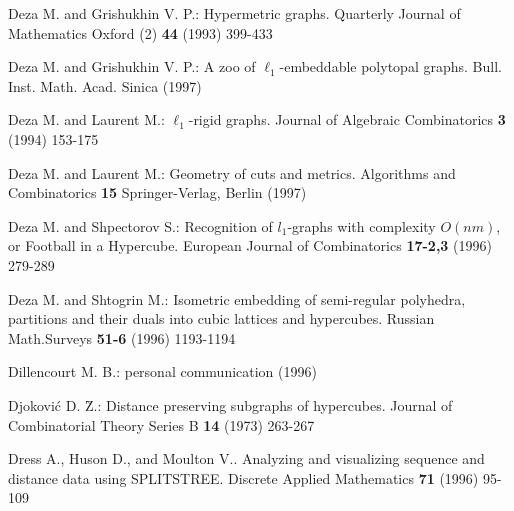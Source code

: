 \begin{thebibliography}{99}
Deza M. and Grishukhin V. P.: 
Hypermetric graphs. 
Quarterly Journal of Mathematics Oxford (2) {\bf 44} (1993) 399-433   
\vspace{-3mm}

Deza M. and Grishukhin V. P.: 
A zoo of $\ell_1$-embeddable polytopal graphs.
Bull. Inst. Math. Acad. Sinica (1997)
\vspace{-3mm}

Deza M. and Laurent M.: 
$\ell_1$-rigid graphs.
Journal of Algebraic Combinatorics {\bf 3} (1994) 153-175
\vspace{-3mm}

Deza M. and Laurent M.:
Geometry of cuts and metrics.
Algorithms and Combinatorics {\bf 15} Springer-Verlag, Berlin
(1997)
\vspace{-3mm}

Deza M. and Shpectorov S.: 
Recognition of $l_{1}$-graphs with complexity $O(nm)$, or 
Football in a Hypercube.
European Journal of Combinatorics {\bf 17-2,3} (1996) 279-289
\vspace{-3mm}
  
Deza M. and Shtogrin M.:
Isometric embedding of semi-regular polyhedra,
partitions and
their duals into cubic lattices and hypercubes.
Russian Math.Surveys
{\bf 51-6} (1996) 1193-1194
\vspace{-3mm}



Dillencourt M. B.:
personal communication (1996)
\vspace{-3mm}

Djokovi\'c D. \u{Z}.:
Distance preserving subgraphs of hypercubes.
Journal of Combinatorial Theory Series B {\bf 14} (1973) 263-267 
\vspace{-3mm}

Dress A., Huson D., and Moulton V..
Analyzing and visualizing sequence and distance data using
SPLITSTREE.
Discrete Applied Mathematics {\bf 71} (1996) 95-109
\vspace{-3mm}


\end{thebibliography}
